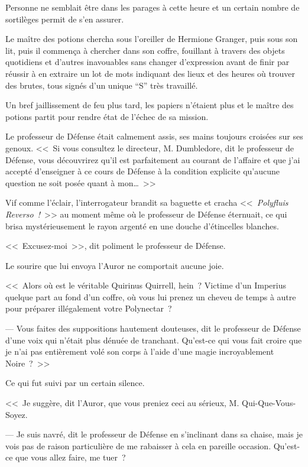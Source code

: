 Personne ne semblait être dans les parages à cette heure et un certain nombre de sortilèges permit de s'en assurer.

Le maître des potions chercha sous l'oreiller de Hermione Granger, puis sous son lit, puis il commença à chercher dans son coffre, fouillant à travers des objets quotidiens et d'autres inavouables sans changer d'expression avant de finir par réussir à en extraire un lot de mots indiquant des lieux et des heures où trouver des brutes, tous signés d'un unique “S” très travaillé.

Un bref jaillissement de feu plus tard, les papiers n'étaient plus et le maître des potions partit pour rendre état de l'échec de sa mission.

\later

Le professeur de Défense était calmement assis, ses mains toujours croisées sur ses genoux. <<~Si vous consultez le directeur, M. Dumbledore, dit le professeur de Défense, vous découvrirez qu'il est parfaitement au courant de l'affaire et que j'ai accepté d'enseigner à ce cours de Défense à la condition explicite qu'aucune question ne soit posée quant à mon…~>>

Vif comme l'éclair, l'interrogateur brandit sa baguette et cracha <<~\emph{Polyfluis Reverso~!}~>> au moment même où le professeur de Défense éternuait, ce qui brisa mystérieusement le rayon argenté en une douche d'étincelles blanches.

<<~Excusez-moi~>>, dit poliment le professeur de Défense.

Le sourire que lui envoya l'Auror ne comportait aucune joie.

<<~Alors où est le véritable Quirinus Quirrell, hein~? Victime d'un Imperius quelque part au fond d'un coffre, où vous lui prenez un cheveu de temps à autre pour préparer illégalement votre Polynectar~?

--- Vous faites des suppositions hautement douteuses, dit le professeur de Défense d'une voix qui n'était plus dénuée de tranchant. Qu'est-ce qui vous fait croire que je n'ai pas entièrement volé son corps à l'aide d'une magie incroyablement Noire~?~>>

Ce qui fut suivi par un certain silence.

<<~Je suggère, dit l'Auror, que vous preniez ceci au sérieux, M. Qui-Que-Vous-Soyez.

--- Je suis navré, dit le professeur de Défense en s'inclinant dans sa chaise, mais je vois pas de raison particulière de me rabaisser à cela en pareille occasion. Qu'est-ce que vous allez faire, me tuer~?

